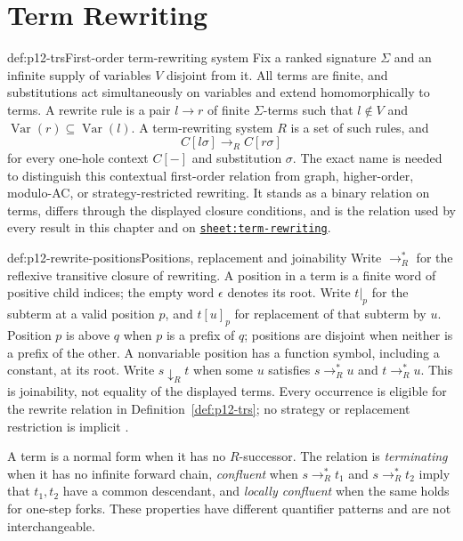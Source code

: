 \chapter{Term Rewriting}\label{sec:p12-rewriting}

\begin{hbdefinition}{def:p12-trs}{First-order term-rewriting system}
Fix a ranked signature \(\Sigma\) and an infinite supply of variables
\(V\) disjoint from it. All terms are finite, and substitutions act
simultaneously on variables and extend homomorphically to terms. A rewrite rule is a
pair \(l\to r\) of finite \(\Sigma\)-terms such that \(l\notin V\) and
\(\operatorname{Var}(r)\subseteq\operatorname{Var}(l)\). A term-rewriting
system \(R\) is a set of such rules, and
\[
 C[l\sigma]\to_R C[r\sigma]
\]
for every one-hole context \(C[-]\) and substitution \(\sigma\). The exact
name is needed to distinguish this contextual first-order relation from graph,
higher-order, modulo-AC, or strategy-restricted rewriting. It stands as a
binary relation on terms, differs through the displayed closure conditions,
and is the relation used by every result in this chapter and on
\hyperref[sheet:term-rewriting]{\texttt{sheet:term-rewriting}}.
\end{hbdefinition}

\begin{hbdefinition}{def:p12-rewrite-positions}{Positions, replacement and joinability}
Write \(\to_R^*\) for the reflexive transitive closure of rewriting.
A position in a term is a finite word of positive child indices; the empty
word \(\epsilon\) denotes its root. Write \(t|_p\) for the subterm
at a valid position \(p\), and \(t[u]_p\) for replacement of that
subterm by \(u\). Position \(p\) is above \(q\) when \(p\) is a
prefix of \(q\); positions are disjoint when neither is a prefix of
the other. A nonvariable position has a function symbol, including a
constant, at its root. Write \(s\downarrow_R t\) when some \(u\)
satisfies \(s\to_R^*u\) and \(t\to_R^*u\). This is joinability,
not equality of the displayed terms. Every occurrence is eligible for
the rewrite relation in Definition~\ref{def:p12-trs}; no strategy or
replacement restriction is implicit \cite[\S2]{Lucas2024LocalConfluence}.
\end{hbdefinition}

A term is a normal form
when it has no \(R\)-successor. The relation is \emph{terminating} when it has
no infinite forward chain, \emph{confluent} when
\(s\to_R^*t_1\) and \(s\to_R^*t_2\) imply that \(t_1,t_2\) have a common
descendant, and \emph{locally confluent} when the same holds for one-step
forks. These properties have different quantifier patterns and are not
interchangeable.

